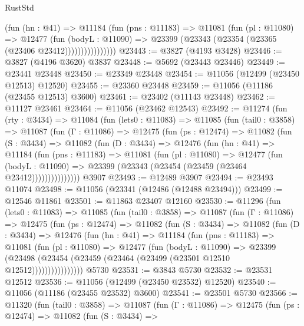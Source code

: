 \begin{lexlean}{RustStd}
\begin{coremodule}
                    (fun (hn : @41) =>
                    @11184
                      (fun (pns : @11183) =>
                      @11081
                        (fun (pl : @11080) =>
                        @12477
                          (fun (bodyL : @11090) =>
                          @23399 (@23343 (@23354 (@23365 (@23406 @23412))))))))))))))))
@23443 := @3827 (@4193 @3428)
@23446 := @3827 (@4196 @3620) @3837
@23448 := @5692 (@23443 @23446)
@23449 := @23441 @23448
@23450 := @23349 @23448
@23454 := @11056 (@12499 (@23450 @12513) @12520)
@23455 := @23360 @23448
@23459 := @11056 (@11186 (@23455 @12513) @3600)
@23461 := @23402 (@11143 @23448)
@23462 := @11127 @23461
@23464 := @11056 (@23462 @12543)
@23492 := @11274
    (fun (rty : @3434) =>
    @11084
      (fun (lets0 : @11083) =>
      @11085
        (fun (tail0 : @3858) =>
        @11087
          (fun (Γ : @11086) =>
          @12475
            (fun (ps : @12474) =>
            @11082
              (fun (S : @3434) =>
              @11082
                (fun (D : @3434) =>
                @12476
                  (fun (hn : @41) =>
                  @11184
                    (fun (pns : @11183) =>
                    @11081
                      (fun (pl : @11080) =>
                      @12477
                        (fun (bodyL : @11090) =>
                        @23399 (@23343 (@23454 (@23459 (@23464 @23412)))))))))))))))
    @3907
@23493 := @12489 @3907
@23494 := @23493 @11074
@23498 := @11056 (@23341 (@12486 (@12488 @23494)))
@23499 := @12546 @11861
@23501 := @11863 @23407 @12160
@23530 := @11296
    (fun (lets0 : @11083) =>
    @11085
      (fun (tail0 : @3858) =>
      @11087
        (fun (Γ : @11086) =>
        @12475
          (fun (ps : @12474) =>
          @11082
            (fun (S : @3434) =>
            @11082
              (fun (D : @3434) =>
              @12476
                (fun (hn : @41) =>
                @11184
                  (fun (pns : @11183) =>
                  @11081
                    (fun (pl : @11080) =>
                    @12477
                      (fun (bodyL : @11090) =>
                      @23399
                        (@23498
                          (@23454 (@23459 (@23464 (@23499 (@23501 @12510 @12512))))))))))))))))
    @5730
@23531 := @3843 @5730
@23532 := @23531 @12512
@23536 := @11056 (@12499 (@23450 @23532) @12520)
@23540 := @11056 (@11186 (@23455 @23532) @3600)
@23541 := @23501 @5730
@23566 := @11320
    (fun (tail0 : @3858) =>
    @11087
      (fun (Γ : @11086) =>
      @12475
        (fun (ps : @12474) =>
        @11082
          (fun (S : @3434) =>

\end{coremodule}
\end{lexlean}
